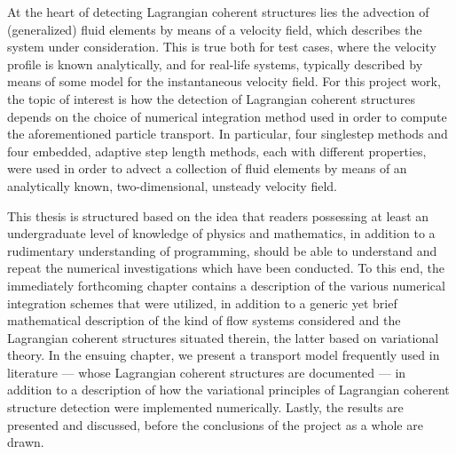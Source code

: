 %
At the heart of detecting Lagrangian coherent structures lies the advection
of (generalized) fluid elements by means of a velocity field, which describes
the system under consideration. This is true both for test cases, where the
velocity profile is known analytically, and for real-life systems, typically
described by means of some model for the instantaneous velocity field. For this
project work, the topic of interest is how the detection of Lagrangian coherent
structures depends on the choice of numerical integration method used in order
to compute the aforementioned particle transport. In particular, four singlestep
methods and four embedded, adaptive step length methods, each with different
properties, were used in order to advect a collection of fluid elements by means
of an analytically known, two-dimensional, unsteady velocity field.

This thesis is structured based on the idea that readers possessing
at least an undergraduate level of knowledge of physics and mathematics, in
addition to a rudimentary understanding of programming, should be able to
understand and repeat the numerical investigations which have been conducted.
To this end, the immediately forthcoming chapter contains a description of the
various numerical integration schemes that were utilized, in addition to a
generic yet brief mathematical description of the kind of flow systems
considered and the Lagrangian coherent structures situated therein, the latter
based on variational theory. In the ensuing chapter, we present a transport
model frequently used in literature --- whose Lagrangian coherent structures
are documented --- in addition to a description of how the variational
principles of Lagrangian coherent structure detection were implemented
numerically. Lastly, the results are presented and discussed, before the
conclusions of the project as a whole are drawn.


